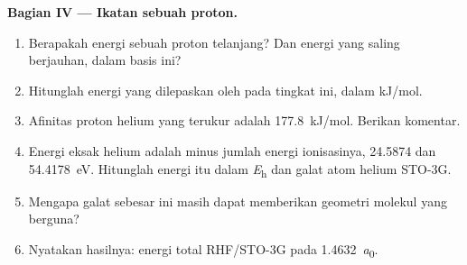 \begin{problem}
\medskip\noindent\textbf{Bagian IV --- Ikatan sebuah proton.}
\begin{enumerate}[resume, beginpenalty=10000]
  \item Berapakah energi sebuah proton telanjang? Dan energi  yang
        saling berjauhan, dalam basis ini?
  \item Hitunglah energi yang dilepaskan oleh  pada tingkat
        ini, dalam \unit{kJ/mol}.
  \item Afinitas proton helium yang terukur adalah \qty{177.8}{kJ/mol}.
        Berikan komentar.
  \item Energi eksak helium adalah minus jumlah energi ionisasinya, 24.5874
        dan \qty{54.4178}{eV}. Hitunglah energi itu dalam \unit{\hartree} dan
        galat atom helium STO-3G.
  \item Mengapa galat sebesar ini masih dapat memberikan geometri molekul
        yang berguna?
  \item Nyatakan hasilnya: energi total RHF/STO-3G  pada
        \qty{1.4632}{\bohr}.
\end{enumerate}
\end{problem}
